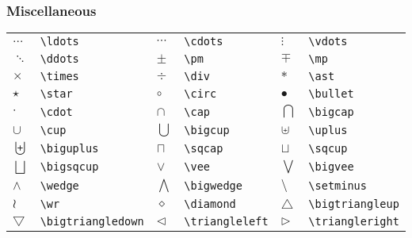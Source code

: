 \documentclass[dvips]{article}
\begin{document}
\subsubsection{Miscellaneous}

\begin{longtable}{llllll}
$\ldots $&          \verb|\ldots|&              
$\cdots $&         \verb|\cdots| &             
$\vdots$&           \verb|\vdots|\\               
$\ddots$&           \verb|\ddots|&               
$\pm$&              \verb|\pm|&                  
$\mp$&             \verb|\mp|\\                
$\times$&           \verb|\times|&               
$\div$&             \verb|\div|&                 
$\ast$&             \verb|\ast|\\                 
$\star$&           \verb|\star|&               
$\circ$&            \verb|\circ|&                
$\bullet$&          \verb|\bullet|\\              
$\cdot$&            \verb|\cdot|&                
$\cap$&            \verb|\cap|&                
$\bigcap$&          \verb|\bigcap|\\             
$\cup$&             \verb|\cup|&                 
$\bigcup$&          \verb|\bigcup|&              
$\uplus$&          \verb|\uplus|\\           
$\biguplus$&        \verb|\biguplus|&            
$\sqcap$&           \verb|\sqcap|&               
$\sqcup$&          \verb|\sqcup|\\             
$\bigsqcup$&        \verb|\bigsqcup|&            
$\vee$&             \verb|\vee|&                
$\bigvee$&          \verb|\bigvee|\\              
$\wedge$&          \verb|\wedge|&              
$\bigwedge$&        \verb|\bigwedge|&            
$\setminus$&        \verb|\setminus|\\            
$\wr$&              \verb|\wr|&                  
$\diamond$&        \verb|\diamond|&          
$\bigtriangleup$&   \verb|\bigtriangleup|\\       
$\bigtriangledown$& \verb|\bigtriangledown|&     
$\triangleleft$&    \verb|\triangleleft|&       
$\triangleright$&  \verb|\triangleright|\\      

\end{longtable}
\end{document}
